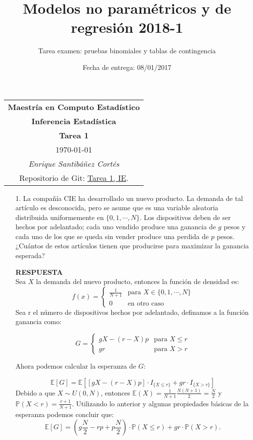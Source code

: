 \documentclass[11pt,letterpaper]{article}
\title{Modelos no paramétricos y de regresión 2018-1}
\author{Tarea examen: pruebas binomiales y tablas de contingencia}
\date{Fecha de entrega: 08/01/2017}
\newcommand{\mP}{\mathbb{P}}
\newcommand{\mE}{\mathbb{E}}
\newcommand{\res}{\textbf{RESPUESTA}\\}
\begin{document}
\begin{table}[ht]
\centering
\begin{tabular}{c}
\textbf{Maestría en Computo Estadístico}\\
\textbf{Inferencia Estadística} \\
\textbf{Tarea 1}\\
\today \\
\emph{Enrique Santibáñez Cortés}\\
Repositorio de Git: \href{https://github.com/Enriquesec/Inferencia_Estad-stica/tree/master/Tareas/Tarea_1}{Tarea 1, IE}.
\end{tabular}
\end{table}
\begin{itemize}
\item[1.] La compañía CIE ha desarrollado un nuevo producto. La demanda de tal artículo es desconocida, pero se asume que es una variable aleatoria distribuida uniformemente en $\{0, 1, \cdots, N \}$.
Los dispositivos deben de ser hechos por adelantado; cada uno vendido produce una ganancia de $g$ pesos y cada uno de los que se queda sin vender produce una perdida de $p$ pesos.
¿Cuántos de estos artículos tienen que producirse para maximizar la ganancia esperada?

\res
Sea $X$ la demanda del nuevo producto, entonces la función de densidad es: 
\begin{equation*}
f(x) = \left\{\begin{array}{ll}
\frac{1}{N+1}& \text{para } X\in\{0,1,\cdots , N\}\\
0 & \text{en otro caso} 
\end{array} \right.
\end{equation*}
Sea r el número de dispositivos hechos por adelantado, definamos a la función ganancia como:

\begin{equation*}
G = \left\{\begin{array}{ll}
gX-(r-X)p & \text{para } X\leq r\\
gr & \text{para } X>r
\end{array} \right.
\end{equation*}

Ahora podemos calcular la esperanza de $G$:

$$\mE[G]=\mE[[gX-(r-X)p]\cdot I_{\{X\leq r \}}+gr\cdot I_{\{X >r\}}] $$
Debido a que $X\sim U(0,N)$, entonces $\mE(X)=\frac{1}{N+1}\frac{N(N+1)}{2}=\frac{N}{2}$ y $\mP(X<r)=\frac{r+1}{N+1}$. Utilizando lo anterior y algunas propiedades básicas de la esperanza podemos concluir que:
$$\mE[G]=\left( g\frac{N}{2}-rp+p\frac{N}{2}\right)\cdot\mP(X\leq r) +gr \cdot \mP(X>r).$$


\end{itemize}
\end{document}
